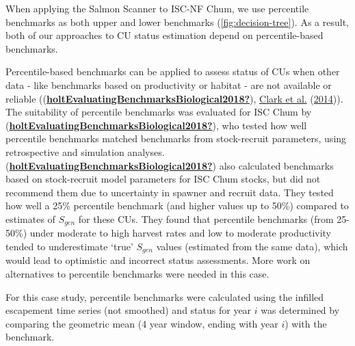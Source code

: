 \documentclass[11pt]{book}
\begin{document}
When applying the Salmon Scanner to ISC-NF Chum, we use percentile benchmarks as both upper and lower benchmarks (\ref{fig:decision-tree}). As a result, both of our approaches to CU status estimation depend on percentile-based benchmarks.

Percentile-based benchmarks can be applied to assess status of CUs when other data - like benchmarks based on productivity or habitat - are not available or reliable ((\protect\hyperlink{ref-holtEvaluatingBenchmarksBiological2018}{\textbf{holtEvaluatingBenchmarksBiological2018?}}), \protect\hyperlink{ref-clarkEvaluationPercentileApproach2014}{Clark et al.} (\protect\hyperlink{ref-clarkEvaluationPercentileApproach2014}{2014})). The suitability of percentile benchmarks was evaluated for ISC Chum by (\protect\hyperlink{ref-holtEvaluatingBenchmarksBiological2018}{\textbf{holtEvaluatingBenchmarksBiological2018?}}), who tested how well percentile benchmarks matched benchmarks from stock-recruit parameters, using retrospective and simulation analyses. (\protect\hyperlink{ref-holtEvaluatingBenchmarksBiological2018}{\textbf{holtEvaluatingBenchmarksBiological2018?}}) also calculated benchmarks based on stock-recruit model parameters for ISC Chum stocks, but did not recommend them due to uncertainty in spawner and recruit data. They tested how well a 25\% percentile benchmark (and higher values up to 50\%) compared to estimates of \(S_{gen}\) for these CUs. They found that percentile benchmarks (from 25-50\%) under moderate to high harvest rates and low to moderate productivity tended to underestimate `true' \(S_{gen}\) values (estimated from the same data), which would lead to optimistic and incorrect status assessments. More work on alternatives to percentile benchmarks were needed in this case.

For this case study, percentile benchmarks were calculated using the infilled escapement time series (not smoothed) and status for year \(i\) was determined by comparing the geometric mean (4 year window, ending with year \(i\)) with the benchmark.
\end{document}
